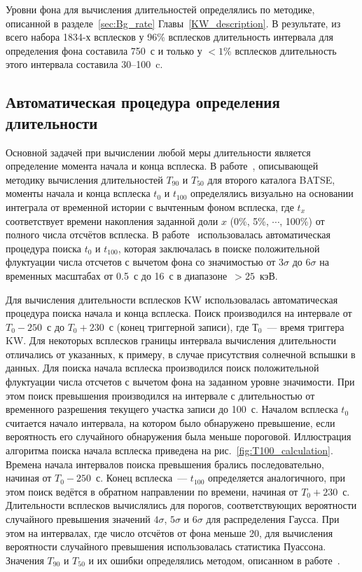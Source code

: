 Уровни фона для вычисления длительностей определялись по методике, описанной в 
разделе~\ref{sec:Bg_rate} Главы~\ref{KW_description}. 
В результате, из всего набора 1834-х всплесков у 96\% всплесков длительность 
интервала для определения фона составила 750~с и только у $<1$\% всплесков длительность этого 
интервала составила 30--100~c.

\subsection{Автоматическая процедура определения длительности}
Основной задачей при вычислении любой меры длительности является определение момента 
начала и конца всплеска. В работе~\citep{Koshut_1996}, описывающей методику вычисления 
длительностей $T_{90}$ и $T_{50}$  для второго каталога BATSE, моменты начала и 
конца всплеска $t_{0}$ и $t_{100}$ определялись визуально на основании интеграла 
от временной истории с вычтенным фоном всплеска, где $t_{x}$ соответствует времени накопления заданной 
доли $x$  (0\%, 5\%, $\cdots$, 100\%) от полного числа отсчётов всплеска. 
В работе~\citep{Bonnell_1997} использовалась автоматическая процедура поиска 
$t_{0}$ и $t_{100}$, которая заключалась в поиске положительной флуктуации числа 
отсчетов с вычетом фона со значимостью от $3\sigma$ до $6\sigma$ на временных 
масштабах от 0.5~с до 16~с в диапазоне~$>25$~кэВ.

Для вычисления длительности всплесков KW использовалась автоматическая 
процедура поиска начала и конца всплеска. Поиск производился на интервале от 
$T_0-250$~с до $T_0+230$~с (конец триггерной записи), где $Т_0$~--- время триггера KW. 
Для некоторых всплесков границы интервала вычисления длительности отличались от указанных, 
к примеру, в случае присутствия солнечной вспышки в данных. Для поиска начала 
всплеска производился поиск положительной флуктуации числа отсчетов с вычетом 
фона на заданном уровне значимости. При этом поиск превышения производился на 
интервале с длительностью от временного разрешения текущего участка записи до 100~с. 
Началом всплеска $t_0$ считается начало интервала, на котором было обнаружено превышение, 
если вероятность его случайного обнаружения была меньше пороговой. 
Иллюстрация алгоритма поиска начала всплеска приведена на рис.~\ref{fig:T100_calculation}.
Времена начала интервалов поиска превышения брались последовательно, начиная от $T_0-250$~с. 
Конец всплеска~--- $t_{100}$ определяется аналогичного, при этом поиск ведётся в 
обратном направлении по времени, начиная от $T_0 + 230$~с. Длительности всплесков 
вычислялись для порогов, соответствующих вероятности случайного превышения 
значений $4\sigma$, $5\sigma$ и $6\sigma$ для распределения Гаусса. При этом на 
интервалах, где число отсчётов от фона меньше 20, для вычисления вероятности 
случайного превышения использовалась статистика Пуассона. Значения $T_{90}$ и $T_{50}$ 
и их ошибки определялись методом, описанном в работе~\citep{Koshut_1996}. 


